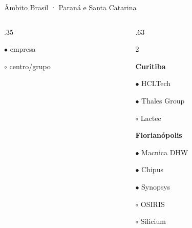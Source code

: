 \begin{frame}{Âmbito Brasil · Paraná e Santa Catarina}
\begin{columns}[T,onlytextwidth]
\begin{column}{.35\textwidth}
{\tiny $\bullet$ empresa\par $\circ$ centro/grupo}
\end{column}
\begin{column}{.63\textwidth}
\footnotesize\setlength{\columnsep}{3mm}\begin{multicols}{2}\raggedright
\textcolor{blue_theme}{\textbf{Curitiba}}\par\smallskip
\noindent\parbox{\linewidth}{$\bullet$ HCLTech}\par
\noindent\parbox{\linewidth}{$\bullet$ Thales Group}\par
\noindent\parbox{\linewidth}{$\circ$ Lactec}\par
\medskip
\textcolor{blue_theme}{\textbf{Florianópolis}}\par\smallskip
\noindent\parbox{\linewidth}{$\bullet$ Macnica DHW}\par
\noindent\parbox{\linewidth}{$\bullet$ Chipus}\par
\noindent\parbox{\linewidth}{$\bullet$ Synopsys}\par
\noindent\parbox{\linewidth}{$\circ$ OSIRIS}\par
\noindent\parbox{\linewidth}{$\circ$ Silicium}\par
\medskip
\end{multicols}
\end{column}
\end{columns}
\creditoBrasil
\end{frame}
